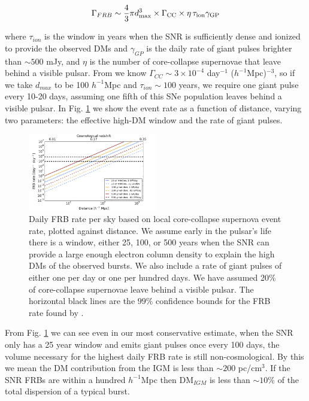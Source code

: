 \documentclass[useAMS,usenatbib]{mn2e}
\begin{document}
\begin{equation}
\Gamma_{FRB} \sim  \frac{4}{3} \pi d_{\rm max}^3 \times \Gamma_{\rm CC} \times
 \eta \, \tau_{\rm ion} \gamma_{\rm GP}
\end{equation}

\noindent where $\tau_{ion}$ is the window in years when the SNR is sufficiently
dense and ionized to provide the observed DMs and $\gamma_{GP}$
is the daily rate of giant pulses brighter than $\sim 500$ mJy, and $\eta$
is the number of core-collapse supernovae that leave behind a visible pulsar. 
From \cite{2014ApJ...792..135T} we know  
$\Gamma_{CC}\sim3 \times 10^{-4}$ day$^{-1}$ ($h^{-1}$Mpc)$^{-3}$,
so if we take $d_{max}$ to be 100 $h^{-1}$Mpc and $\tau_{ion}\sim100$ years,
we require one giant pulse every 10-20 days, assuming one fifth of this SNe population
leaves behind a visible pulsar.
In Fig. \ref{FIG-RATE} 
we show the event rate as a function of distance, varying two parameters: the 
effective high-DM window and the rate of giant pulses. 

\begin{figure}
\label{FIG-RATE}
  \centering
   \includegraphics[width=0.5\textwidth]{FRB_SNR_rate.png}
   \caption{Daily FRB rate per sky based on local core-collapse supernova 
   event rate, plotted against distance.
   We assume early in the pulsar's life there is a window, either 
   25, 100, or 500 years when the SNR can provide a large enough electron 
   column density to explain the high DMs of the observed bursts. We also
   include a rate of giant pulses of either one per day or one per hundred
   days. We have assumed 20$\%$ of core-collapse supernovae leave behind
   a visible pulsar.
   The horizontal black lines are the $99\%$ confidence bounds for the FRB rate
   found by \protect\cite{2015arXiv150500834R}.}
\end{figure}

From Fig. \ref{FIG-RATE} we can see even in our most conservative estimate, when
the SNR only has a 25 year window and emits giant pulses once every
100 days, the volume necessary for the highest daily FRB rate is still non-cosmological.
By this we mean the DM contribution from the IGM is less than $\sim 200$ pc/cm$^3$.
If the SNR FRBs are within a hundred $h^{-1}$Mpc then DM$_{IGM}$ is less than 
$\sim 10 \%$  of the total dispersion of a typical burst.
\end{document}
